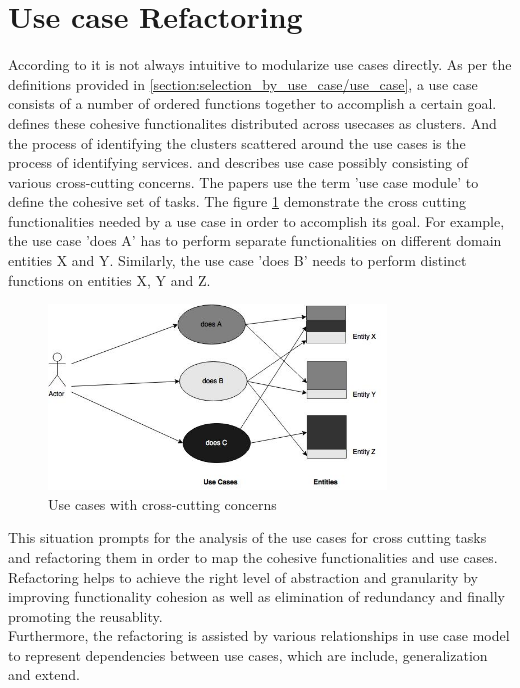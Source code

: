 \section{Use case Refactoring}\label{section:selection_by_use_case/use_case_refactoring}
According to \cite{Jacobson:1987aa} it is not always intuitive to modularize use cases directly. As per the definitions provided in \ref{section:selection_by_use_case/use_case}, a use case consists of a number of ordered functions together to accomplish a certain goal. \cite{Jacobson:1987aa} defines these cohesive functionalites distributed across usecases as clusters. And the process of identifying the clusters scattered around the use cases is the process of identifying services. \cite{Ng:2004aa} and \cite{Jacobson:2003aa} describes use case possibly consisting of various cross-cutting concerns. The papers use the term 'use case module' to define the cohesive set of tasks. The figure \ref{fig:selection_by_use_case/use_case_one} demonstrate the cross cutting functionalities needed by a use case in order to accomplish its goal. For example, the use case 'does A' has to perform separate functionalities on different domain entities X and Y. Similarly, the use case 'does B' needs to perform distinct functions on entities X, Y and Z.
\begin{figure}[H]
\begin{center}
\includegraphics[width=0.8\textwidth]{figures/use-case-one}
\caption{Use cases with cross-cutting concerns \cite{Ng:2004aa}}
\label{fig:selection_by_use_case/use_case_one}
\end{center}
\end{figure}
This situation prompts for the analysis of the use cases for cross cutting tasks and refactoring them in order to map the cohesive functionalities and use cases. Refactoring helps to achieve the right level of abstraction and granularity by improving functionality cohesion as well as elimination of redundancy and finally promoting the reusablity. \cite{Doh:2007aa}
\\
Furthermore, the refactoring is assisted by various relationships in use case model to represent dependencies between use cases, which are include, generalization and extend. \cite{Ng:2004aa}
\\
